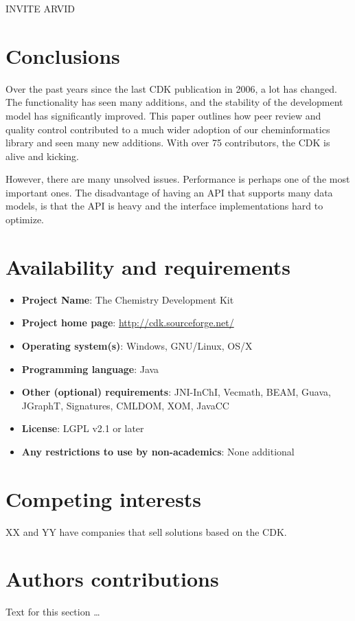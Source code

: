 \documentclass[10pt]{bmc_article}
\newenvironment{bmcformat}{\begin{raggedright}\baselineskip20pt\sloppy\setboolean{publ}{false}}{\end{raggedright}\baselineskip20pt\sloppy}
\begin{document}
\begin{bmcformat}
INVITE ARVID


\section*{Conclusions}

Over the past years since the last CDK publication in 2006, a lot has changed. The functionality
has seen many additions, and the stability of the development model has significantly improved.
This paper outlines how peer review and quality control contributed to a much wider adoption
of our cheminformatics library and seen many new additions. With over 75 contributors,
the CDK is alive and kicking.

However, there are many unsolved issues. Performance is perhaps one of the most important ones.
The disadvantage of having an API that supports many data models, is that the API is heavy and
the interface implementations hard to optimize.

\section*{Availability and requirements}

\begin{itemize}
\item \textbf{Project Name}: The Chemistry Development Kit
\item \textbf{Project home page}: \url{http://cdk.sourceforge.net/}
\item \textbf{Operating system(s)}: Windows, GNU/Linux, OS/X
\item \textbf{Programming language}: Java
\item \textbf{Other (optional) requirements}: JNI-InChI, Vecmath, BEAM, Guava, JGraphT, Signatures, CMLDOM, XOM, JavaCC
\item \textbf{License}: LGPL v2.1 or later
\item \textbf{Any restrictions to use by non-academics}: None additional
\end{itemize}

\section*{Competing interests}
XX and YY have companies that sell solutions based on the CDK.

\section*{Authors contributions}
    Text for this section \ldots


\end{bmcformat}
\end{document}
